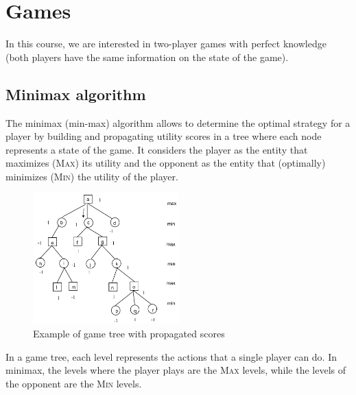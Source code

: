 \chapter{Games}

In this course, we are interested in two-player games with 
perfect knowledge (both players have the same information on the state of the game).


\section{Minimax algorithm}
The minimax (min-max) algorithm allows to determine the optimal strategy for a player by
building and propagating utility scores in a tree where each node represents a state of the game.
It considers the player as the entity that maximizes (\textsc{Max}) its utility and
the opponent as the entity that (optimally) minimizes (\textsc{Min}) the utility of the player.


\begin{figure}[H]
    \centering
    \includegraphics[width=0.5\textwidth]{img/_minmax.pdf}
    \caption{Example of game tree with propagated scores}
\end{figure}

In a game tree, each level represents the actions that a single player can do.
In minimax, the levels where the player plays are the \textsc{Max} levels, 
while the levels of the opponent are the \textsc{Min} levels.

